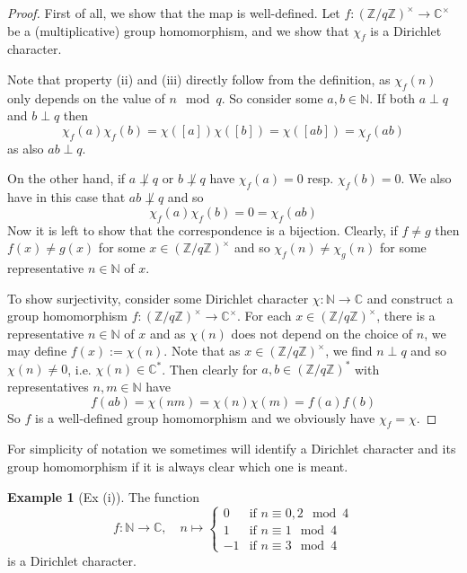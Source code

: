 \documentclass{scrartcl}
\newcommand{\N}{\mathbb{N}}
\newcommand{\Z}{\mathbb{Z}}
\newcommand{\C}{\mathbb{C}}
\newcommand{\units}{\times}
\theoremstyle{definition}
\newtheorem{example}[definition]{Example}
\begin{document}
\begin{proof}
    First of all, we show that the map is well-defined. Let $f: (\Z/q\Z)^\units \to \C^\units$ be a (multiplicative) group homomorphism, and we show that $\chi_f$ is a Dirichlet character.
    
    Note that property (ii) and (iii) directly follow from the definition, as $\chi_f(n)$ only depends on the value of $n \mod q$.
    So consider some $a, b \in \N$.
    If both $a \perp q$ and $b \perp q$ then
    \begin{equation*}
        \chi_f(a)\chi_f(b) = \chi([a])\chi([b]) = \chi([ab]) = \chi_f(ab)
    \end{equation*}
    as also $ab \perp q$.

    On the other hand, if $a \not\perp q$ or $b \not\perp q$ have $\chi_f(a) = 0$ resp. $\chi_f(b) = 0$.
    We also have in this case that $ab \not\perp q$ and so
    \begin{equation*}
        \chi_f(a)\chi_f(b) = 0 = \chi_f(ab)
    \end{equation*}
    Now it is left to show that the correspondence is a bijection.
    Clearly, if $f \neq g$ then $f(x) \neq g(x)$ for some $x \in (\Z/q\Z)^\units$ and so $\chi_f(n) \neq \chi_g(n)$ for some representative $n \in \N$ of $x$.
    
    To show surjectivity, consider some Dirichlet character $\chi: \N \to \C$ and construct a group homomorphism $f: (\Z/q\Z)^\units \to \C^\units$. 
    For each $x \in (\Z/q\Z)^\units$, there is a representative $n \in \N$ of $x$ and as $\chi(n)$ does not depend on the choice of $n$, we may define $f(x) := \chi(n)$.
    Note that as $x \in (\Z/q\Z)^\units$, we find $n \perp q$ and so $\chi(n) \neq 0$, i.e. $\chi(n) \in \C^*$.
    Then clearly for $a, b \in (\Z/q\Z)^*$ with representatives $n, m \in \N$ have
    \begin{equation*}
        f(ab) = \chi(nm) = \chi(n)\chi(m) = f(a)f(b)
    \end{equation*}
    So $f$ is a well-defined group homomorphism and we obviously have $\chi_f = \chi$.
\end{proof}
For simplicity of notation we sometimes will identify a Dirichlet character and its group homomorphism if it is always clear which one is meant.
\begin{example}[Ex (i)]
    \label{ex:nontrivial_dirichlet_character_mod_4}
    The function
    \begin{equation*}
        f: \N \to \C, \quad n \mapsto \begin{cases}
            0 & \text{if $n \equiv 0, 2 \mod 4$} \\
            1 & \text{if $n \equiv 1 \mod 4$} \\
            -1 & \text{if $n \equiv 3 \mod 4$}
        \end{cases}
    \end{equation*}
    is a Dirichlet character.
\end{example}
\end{document}

